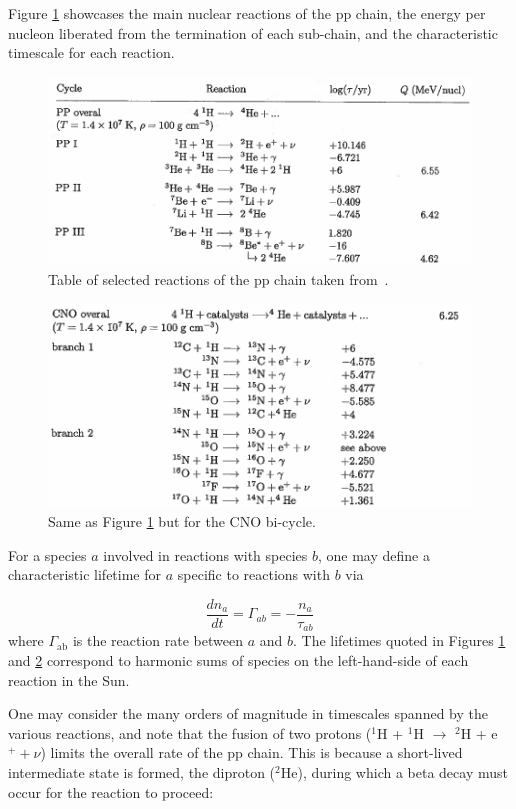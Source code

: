\documentclass[12pt]{article}
\newcommand{\deriv}[2]{\frac{d #1}{d #2}}
\begin{document}
Figure \ref{fig:pp_reactions_psu} showcases the main nuclear reactions of the pp chain, the energy per nucleon liberated from the termination of each sub-chain, and the characteristic timescale for each reaction. 

\begin{figure}[H]
    \centering
    \includegraphics[width=0.6\linewidth]{Appendices//Nuclear Fusion/PP_reactions.png}
    \caption{Table of selected reactions of the pp chain taken from~\cite{EracleousPSU}.}
    \label{fig:pp_reactions_psu}
\end{figure}

\begin{figure}[H]
    \centering
    \includegraphics[width=0.6\linewidth]{Appendices//Nuclear Fusion/CNO_reactions.png}
    \caption{Same as Figure \ref{fig:pp_reactions_psu} but for the CNO bi-cycle.}
    \label{fig:CNO_reactions_psu}
\end{figure}

For a species $a$ involved in reactions with species $b$, one may define a characteristic lifetime for $a$ specific to reactions with $b$ via

\begin{equation}
    \deriv{n_a}{t} = \Gamma_{ab} = -\frac{n_a}{\tau_{ab}}
\end{equation}
%
where $\Gamma_\mathrm{ab}$ is the reaction rate between $a$ and $b$. The lifetimes quoted in Figures \ref{fig:pp_reactions_psu} and \ref{fig:CNO_reactions_psu} correspond to harmonic sums of species on the left-hand-side of each reaction in the Sun.

One may consider the many orders of magnitude in timescales spanned by the various reactions, and note that the fusion of two protons ($^{1}$H + $^{1}$H $\rightarrow$ $^{2}$H + e$^{+} + \nu$) limits the overall rate of the pp chain. This is because a short-lived intermediate state is formed, the diproton ($^2$He), during which a beta decay must occur for the reaction to proceed:
\end{document}
